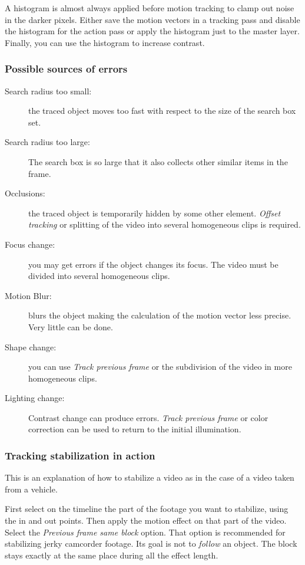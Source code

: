 A histogram is almost always applied before motion tracking to clamp out noise in the darker pixels. Either save the motion vectors in a tracking pass and disable the histogram for the action pass or apply the histogram just to the master layer. Finally, you can use the histogram to increase contrast.

\subsubsection*{Possible sources of errors}
\label{ssub:possible_sources_errors}

\begin{description}
    \item[Search radius too small:] the traced object moves too fast with respect to the size of the search box set.
    \item[Search radius too large:] The search box is so large that it also collects other similar items in the frame.
    \item[Occlusions:] the traced object is temporarily hidden by some other element. \textit{Offset tracking} or splitting of the video into several homogeneous clips is required.
    \item[Focus change:] you may get errors if the object changes its focus. The video must be divided into several homogeneous clips.
    \item[Motion Blur:] blurs the object making the calculation of the motion vector less precise. Very little can be done.
    \item[Shape change:] you can use \textit{Track previous frame} or the subdivision of the video in more homogeneous clips.
    \item[Lighting change:] Contrast change can produce errors. \textit{Track previous frame} or color correction can be used to return to the initial illumination.
\end{description}

\subsubsection*{Tracking stabilization in action}
\label{ssub:tracking_stabilization_action}

This is an explanation of how to stabilize a video as in the case of a video taken from a vehicle.

First select on the timeline the part of the footage you want to stabilize, using the in and out points. Then apply the motion effect on that part of the video. Select the \textit{Previous frame same block} option. That option is recommended for stabilizing jerky camcorder footage. Its goal is not to \textit{follow} an object. The block stays exactly at the same place during all the effect length.

